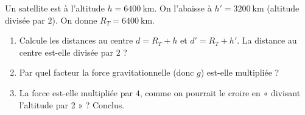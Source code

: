 \documentclass[11pt,a4paper]{article}
\begin{document}
\begin{exo}
Un satellite est à l'altitude $h=\qty{6400}{\kilo\metre}$. On l'abaisse à
$h'=\qty{3200}{\kilo\metre}$ (altitude divisée par $2$). On donne
$R_T=\qty{6400}{\kilo\metre}$.
\begin{enumerate}[label=\alph*)]
  \item Calcule les distances au centre $d=R_T+h$ et $d'=R_T+h'$. La distance
        au centre est-elle divisée par $2$ ?
  \item Par quel facteur la force gravitationnelle (donc $g$) est-elle multipliée ?
  \item La force est-elle multipliée par $4$, comme on pourrait le croire en
        « divisant l'altitude par 2 » ? Conclus.
\end{enumerate}
\end{exo}
\end{document}
